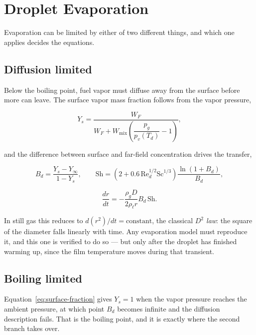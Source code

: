 \documentclass[11pt]{article}
\begin{document}
\section{Droplet Evaporation}

Evaporation can be limited by either of two different things, and which one applies
decides the equations.

\subsection{Diffusion limited}

Below the boiling point, fuel vapor must diffuse away from the surface before more can
leave. The surface vapor mass fraction follows from the vapor pressure,

\begin{equation}
  Y_s=\frac{W_F}{W_F+W_{\mathrm{mix}}\left(\dfrac{p_g}{p_v(T_d)}-1\right)},
  \label{eq:surface-fraction}
\end{equation}

and the difference between surface and far-field concentration drives the transfer,

\begin{equation}
  B_d=\frac{Y_s-Y_\infty}{1-Y_s},
  \qquad
  \mathrm{Sh}=\left(2+0.6\,\mathrm{Re}_d^{1/2}\mathrm{Sc}^{1/3}\right)
  \frac{\ln(1+B_d)}{B_d},
  \label{eq:spalding}
\end{equation}

\begin{equation}
  \frac{dr}{dt}=-\frac{\rho_g D}{2\rho_{\ell}r}B_d\,\mathrm{Sh}.
  \label{eq:evaporation}
\end{equation}

In still gas this reduces to $d(r^{2})/dt=\mathrm{constant}$, the classical
\emph{$D^2$ law}: the square of the diameter falls linearly with time. Any evaporation
model must reproduce it, and this one is verified to do so --- but only after the droplet
has finished warming up, since the film temperature moves during that transient.

\subsection{Boiling limited}

Equation~\eqref{eq:surface-fraction} gives $Y_s=1$ when the vapor pressure reaches the
ambient pressure, at which point $B_d$ becomes infinite and the diffusion description
fails. That is the boiling point, and it is exactly where the second branch takes over.
\end{document}
